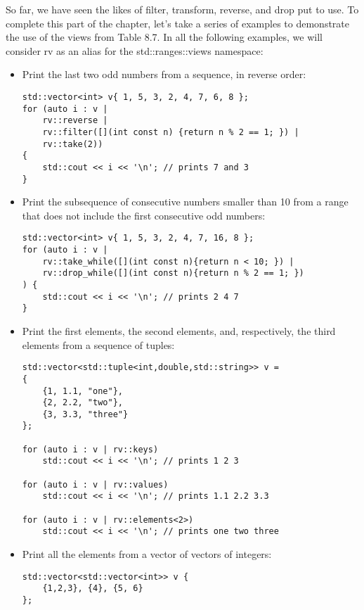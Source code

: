So far, we have seen the likes of filter, transform, reverse, and drop put to use. To complete this part of the chapter, let’s take a series of examples to demonstrate the use of the views from Table 8.7. In all the following examples, we will consider rv as an alias for the std::ranges::views namespace:

\begin{itemize}
\item
Print the last two odd numbers from a sequence, in reverse order:

\begin{lstlisting}[style=styleCXX]
std::vector<int> v{ 1, 5, 3, 2, 4, 7, 6, 8 };
for (auto i : v |
	rv::reverse |
	rv::filter([](int const n) {return n % 2 == 1; }) |
	rv::take(2))
{
	std::cout << i << '\n'; // prints 7 and 3
}
\end{lstlisting}

\item
Print the subsequence of consecutive numbers smaller than 10 from a range that does not include the first consecutive odd numbers:

\begin{lstlisting}[style=styleCXX]
std::vector<int> v{ 1, 5, 3, 2, 4, 7, 16, 8 };
for (auto i : v |
	rv::take_while([](int const n){return n < 10; }) |
	rv::drop_while([](int const n){return n % 2 == 1; })
) {
	std::cout << i << '\n'; // prints 2 4 7
}
\end{lstlisting}

\item
Print the first elements, the second elements, and, respectively, the third elements from a sequence of tuples:

\begin{lstlisting}[style=styleCXX]
std::vector<std::tuple<int,double,std::string>> v =
{
	{1, 1.1, "one"},
	{2, 2.2, "two"},
	{3, 3.3, "three"}
};

for (auto i : v | rv::keys)
	std::cout << i << '\n'; // prints 1 2 3
	
for (auto i : v | rv::values)
	std::cout << i << '\n'; // prints 1.1 2.2 3.3
	
for (auto i : v | rv::elements<2>)
	std::cout << i << '\n'; // prints one two three
\end{lstlisting}

\item
Print all the elements from a vector of vectors of integers:

\begin{lstlisting}[style=styleCXX]
std::vector<std::vector<int>> v {
	{1,2,3}, {4}, {5, 6}
};


\end{lstlisting}
\end{itemize}
